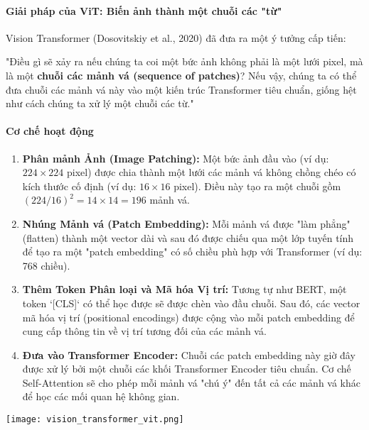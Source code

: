 \paragraph{Giải pháp của ViT: Biến ảnh thành một chuỗi các "từ"}
Vision Transformer (Dosovitskiy et al., 2020) đã đưa ra một ý tưởng cấp tiến:
\begin{tcolorbox}[
    title=Trực giác của Vision Transformer,
    colback=blue!5!white, colframe=blue!75!black, fonttitle=\bfseries
]
"Điều gì sẽ xảy ra nếu chúng ta coi một bức ảnh không phải là một lưới pixel, mà là một \textbf{chuỗi các mảnh vá (sequence of patches)}? Nếu vậy, chúng ta có thể đưa chuỗi các mảnh vá này vào một kiến trúc Transformer tiêu chuẩn, giống hệt như cách chúng ta xử lý một chuỗi các từ."
\end{tcolorbox}

\paragraph{Cơ chế hoạt động}
\begin{enumerate}
    \item \textbf{Phân mảnh Ảnh (Image Patching):} Một bức ảnh đầu vào (ví dụ: $224 \times 224$ pixel) được chia thành một lưới các mảnh vá không chồng chéo có kích thước cố định (ví dụ: $16 \times 16$ pixel). Điều này tạo ra một chuỗi gồm $(224/16)^2 = 14 \times 14 = 196$ mảnh vá.
    \item \textbf{Nhúng Mảnh vá (Patch Embedding):} Mỗi mảnh vá được "làm phẳng" (flatten) thành một vector dài và sau đó được chiếu qua một lớp tuyến tính để tạo ra một "patch embedding" có số chiều phù hợp với Transformer (ví dụ: 768 chiều).
    \item \textbf{Thêm Token Phân loại và Mã hóa Vị trí:} Tương tự như BERT, một token `[CLS]` có thể học được sẽ được chèn vào đầu chuỗi. Sau đó, các vector mã hóa vị trí (positional encodings) được cộng vào mỗi patch embedding để cung cấp thông tin về vị trí tương đối của các mảnh vá.
    \item \textbf{Đưa vào Transformer Encoder:} Chuỗi các patch embedding này giờ đây được xử lý bởi một chuỗi các khối Transformer Encoder tiêu chuẩn. Cơ chế Self-Attention sẽ cho phép mỗi mảnh vá "chú ý" đến tất cả các mảnh vá khác để học các mối quan hệ không gian.
\end{enumerate}

\begin{center}
    \texttt{[image: vision\_transformer\_vit.png]}
    \label{fig:vision_transformer_vit}
\end{center}

